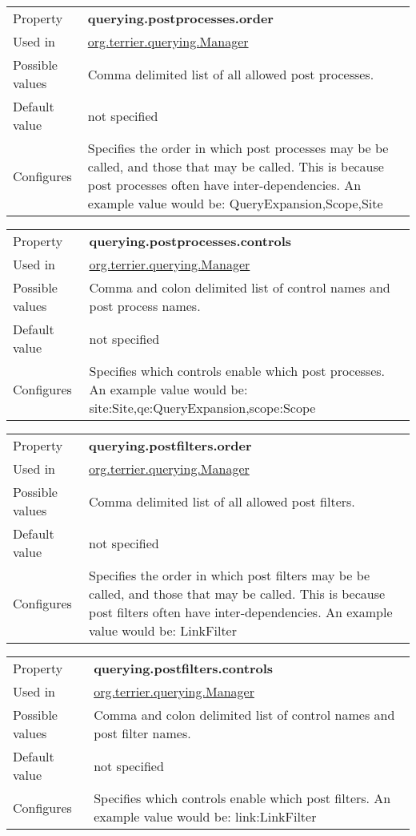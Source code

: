 \begin{longtable}[]{@{}ll@{}}
\toprule
Property & \textbf{querying.postprocesses.order}\tabularnewline
Used in &
\href{javadoc/org/terrier/querying/Manager.html}{org.terrier.querying.Manager}\tabularnewline
Possible values & Comma delimited list of all allowed post
processes.\tabularnewline
Default value & not specified\tabularnewline
Configures & Specifies the order in which post processes may be be
called, and those that may be called. This is because post processes
often have inter-dependencies. An example value would be:
QueryExpansion,Scope,Site\tabularnewline
\bottomrule
\end{longtable}

\begin{longtable}[]{@{}ll@{}}
\toprule
Property & \textbf{querying.postprocesses.controls}\tabularnewline
Used in &
\href{javadoc/org/terrier/querying/Manager.html}{org.terrier.querying.Manager}\tabularnewline
Possible values & Comma and colon delimited list of control names and
post process names.\tabularnewline
Default value & not specified\tabularnewline
Configures & Specifies which controls enable which post processes. An
example value would be:
site:Site,qe:QueryExpansion,scope:Scope\tabularnewline
\bottomrule
\end{longtable}

\begin{longtable}[]{@{}ll@{}}
\toprule
Property & \textbf{querying.postfilters.order}\tabularnewline
Used in &
\href{javadoc/org/terrier/querying/Manager.html}{org.terrier.querying.Manager}\tabularnewline
Possible values & Comma delimited list of all allowed post
filters.\tabularnewline
Default value & not specified\tabularnewline
Configures & Specifies the order in which post filters may be be called,
and those that may be called. This is because post filters often have
inter-dependencies. An example value would be: LinkFilter\tabularnewline
\bottomrule
\end{longtable}

\begin{longtable}[]{@{}ll@{}}
\toprule
Property & \textbf{querying.postfilters.controls}\tabularnewline
Used in &
\href{javadoc/org/terrier/querying/Manager.html}{org.terrier.querying.Manager}\tabularnewline
Possible values & Comma and colon delimited list of control names and
post filter names.\tabularnewline
Default value & not specified\tabularnewline
Configures & Specifies which controls enable which post filters. An
example value would be: link:LinkFilter\tabularnewline
\bottomrule
\end{longtable}

